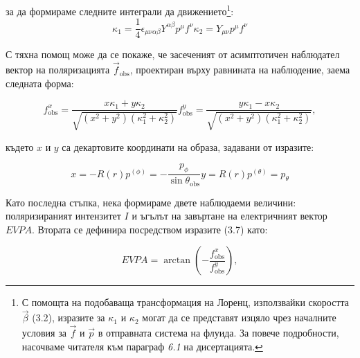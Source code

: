 \documentclass[12pt]{article}
\numberwithin{equation}{section}
\numberwithin{figure}{section}
\begin{document}
	\noindent за да формираме следните интеграли да движението\footnote{С помощта на подобаваща трансформация на Лоренц, използвайки скоростта $\vec{\beta}$ (3.2), изразите за $\kappa_1$ и $\kappa_2$ могат да се представят изцяло чрез началните условия за $\vec{f}$ и $\vec{p}$ в отправната система на флуида. За повече подробности, насочваме читателя към параграф \emph{6.1} на дисертацията.}:
	\begin{subequations}
		\begin{equation}
			\kappa_1 = \frac{1}{4}\epsilon_{\mu\nu\alpha\beta}Y^{\alpha\beta}p^\mu f^\nu
		\end{equation}
		\begin{equation}
			\kappa_2 = Y_{\mu\nu}p^\mu f^\nu
		\end{equation}
	\end{subequations}

	С тяхна помощ може да се покаже, че засеченият от асимптотичен наблюдател вектор на поляризацията $\vec{f}_\text{obs}$, проектиран върху равнината на наблюдение, заема следната форма:
	
	\begin{subequations}
		\begin{equation}
			f^x_\text{obs} = \frac{x\kappa_1 + y\kappa_2}{\sqrt{(x^2 + y^2)(\kappa_1^2 + \kappa_2^2)}}
		\end{equation}
		\begin{equation}
			f^y_\text{obs} = \frac{y \kappa_1 - x\kappa_2}{\sqrt{(x^2 + y^2)(\kappa_1^2 + \kappa_2^2)}},
		\end{equation}
	\end{subequations}
	
	където $x$ и $y$ са декартовите координати на образа, задавани от изразите:
	
	\begin{subequations}
		\begin{equation}
			x = -R(r)p^{(\phi)} = -\frac{p_\phi}{\sin\theta_\text{obs}}
		\end{equation}
		\begin{equation}
			y = R(r)p^{(\theta)} = p_\theta
		\end{equation}
	\end{subequations}
	
	Като последна стъпка, нека формираме двете наблюдаеми величини: поляризираният интензитет $I$ и ъгълът на завъртане на електричният вектор $EVPA$. Втората се дефинира посредством изразите (3.7) като:
	
	\begin{equation}
		EVPA = \arctan\left(-\frac{f^x_\text{obs}}{f^y_\text{obs}}\right),
	\end{equation}
	
\end{document}
